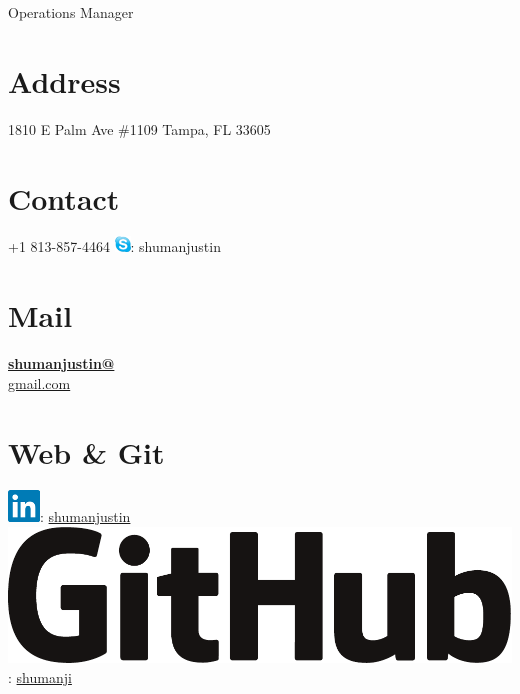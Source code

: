 \documentclass[]{friggeri-cv}
\begin{document}
      {Operations Manager}
      

\begin{aside}
  \section{Address}
    1810 E Palm Ave \#1109
    Tampa, FL 33605
    ~
  \section{Contact}
    +1 813-857-4464
    \includegraphics[scale=0.5]{img/skype}: shumanjustin
    ~
  \section{Mail}
    \href{mailto:shumanjustin@gmail.com}{\textbf{shumanjustin@}\\gmail.com}
    ~
  \section{Web \& Git}
    \includegraphics[scale=0.25]{img/linkedin}: \href{http://linkedin.com/in/shumanjustin}{shumanjustin}
    \includegraphics[scale=.055]{img/GitHub_Logo}: \href{https://github.com/shumanji}{shumanji}
    ~
\end{aside}
\end{document}

